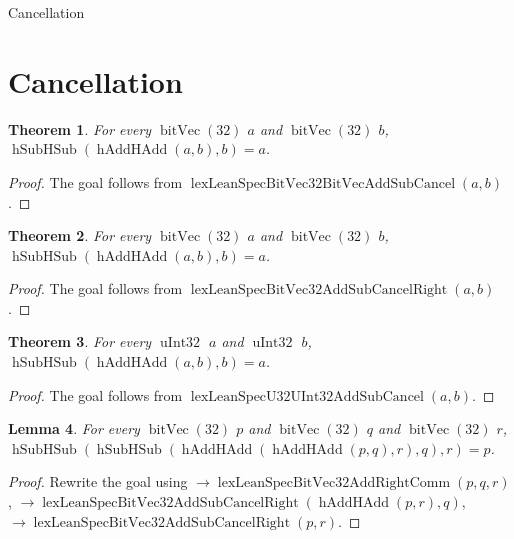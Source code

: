 \documentclass[11pt]{article}
\newtheorem{theorem}{Theorem}[section]
\newtheorem{lemma}[theorem]{Lemma}
\theoremstyle{definition}
\begin{document}
\begin{center}
{\LARGE Cancellation}
\end{center}
\section{Cancellation}
\label{ll:cancellation:addition}
\begin{theorem}
\label{ll:cancellation:add-sub-cancel}
For every \(\operatorname{bitVec}(32)\) \(a\) and \(\operatorname{bitVec}(32)\) \(b\), \(\operatorname{hSubHSub}(\operatorname{hAddHAdd}(a, b), b) = a\).
\end{theorem}
\begin{proof}
The goal follows from \(\operatorname{lexLeanSpecBitVec32BitVecAddSubCancel}(a, b)\).
\end{proof}
\begin{theorem}
\label{ll:cancellation:add-sub-cancel-group}
For every \(\operatorname{bitVec}(32)\) \(a\) and \(\operatorname{bitVec}(32)\) \(b\), \(\operatorname{hSubHSub}(\operatorname{hAddHAdd}(a, b), b) = a\).
\end{theorem}
\begin{proof}
The goal follows from \(\operatorname{lexLeanSpecBitVec32AddSubCancelRight}(a, b)\).
\end{proof}
\begin{theorem}
\label{ll:cancellation:add-sub-cancel-u32}
For every \(\operatorname{uInt32}\) \(a\) and \(\operatorname{uInt32}\) \(b\), \(\operatorname{hSubHSub}(\operatorname{hAddHAdd}(a, b), b) = a\).
\end{theorem}
\begin{proof}
The goal follows from \(\operatorname{lexLeanSpecU32UInt32AddSubCancel}(a, b)\).
\end{proof}
\begin{lemma}
\label{ll:cancellation:add-sub-sub-cancel}
For every \(\operatorname{bitVec}(32)\) \(p\) and \(\operatorname{bitVec}(32)\) \(q\) and \(\operatorname{bitVec}(32)\) \(r\), \(\operatorname{hSubHSub}(\operatorname{hSubHSub}(\operatorname{hAddHAdd}(\operatorname{hAddHAdd}(p, q), r), q), r) = p\).
\end{lemma}
\begin{proof}
Rewrite the goal using \(\rightarrow \operatorname{lexLeanSpecBitVec32AddRightComm}(p, q, r)\), \(\rightarrow \operatorname{lexLeanSpecBitVec32AddSubCancelRight}(\operatorname{hAddHAdd}(p, r), q)\), \(\rightarrow \operatorname{lexLeanSpecBitVec32AddSubCancelRight}(p, r)\).
\end{proof}
\end{document}
